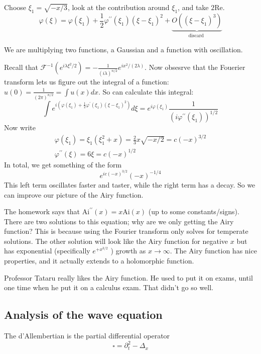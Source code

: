 Choose $\xi_1=\sqrt{-x / 3}$, look at the contribution around $\xi_{1}$, and take $2 \mathrm{Re}$.
$$
\varphi(\xi)=\varphi\left(\xi_{1}\right)+\frac{1}{2} \varphi^{\prime \prime}\left(\xi_{1}\right)\left(\xi-\xi_{1}\right)^{2}+\underbrace{O\left(\left(\xi-\xi_{1}\right)^{3}\right)}_{\text {discard }}
$$

We are multiplying two functions, a Gaussian and a function with oscillation.

Recall that $\mathcal{F}^{-1}\left(e^{i \lambda \xi^{2} / 2}\right)=-\frac{1}{(i \lambda)^{n / 2}} e^{i x^{2} /(2 \lambda)} .$ Now obsesrve that the Fouerier transform lets us figure out the integral of a function: $\widehat{u}(0)=\frac{1}{(2 \pi)^{n / 2}}=\int u(x) d x .$ So can calculate this integral:
$$
\int e^{i\left(\varphi\left(\xi_{1}\right)+\frac{1}{2} \varphi^{\prime}\left(\xi_{1}\right)\left(\xi-\xi_{1}\right)^{2}\right)} d \xi=e^{i \varphi\left(\xi_{1}\right)} \frac{1}{\left(i \varphi^{\prime \prime}\left(\xi_{1}\right)\right)^{1 / 2}}
$$
Now write
$$
\begin{gathered}
\varphi\left(\xi_{1}\right)=\xi_{1}\left(\xi_{1}^{2}+x\right)=\frac{2}{3} x \sqrt{-x / 2}=c(-x)^{3 / 2} \\
\varphi^{\prime \prime}(\xi)=6 \xi=c(-x)^{1 / 2}
\end{gathered}
$$
In total, we get something of the form
$$
e^{i c(-x)^{3 / 2}}(-x)^{-1 / 4}
$$
This left term oscillates faster and taster, while the right term has a decay. So we can improve our picture of the Airy function.

The homework says that $\mathrm{Ai}^{\prime \prime}(x)=x \mathrm{Ai}(x)$ (up to some constants/signs). There are two solutions to this equation; why are we only getting the Airy function? This is because using the Fourier transform only solves for temperate solutions. The other solution will look like the Airy function for negative $x$ but has exponential (specifically $e^{+x^{3 / 2}}$ ) growth as $x \rightarrow \infty$. The Airy function has nice properties, and it actually extends to a holomorphic function.

Professor Tataru really likes the Airy function. He used to put it on exams, until one time when he put it on a calculus exam. That didn’t go so well.

\subsection{Analysis of the wave equation}
\begin{definition}
[d'Allembertian] The d'Allembertian is the partial differential operator
\[
    \square =\partial_{t}^{2}-\Delta_{x}
\]
\end{definition}

